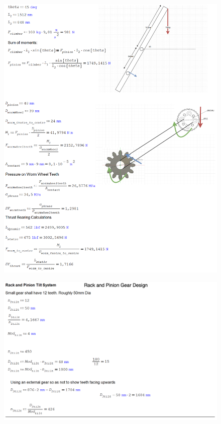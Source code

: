 \begin{figure}[H]
    \centering
    \includegraphics[width=1\linewidth]{chaps-append/calcs/tilting_max_torque_calcs.png}
\end{figure}
\begin{figure}[H]
    \centering
    \includegraphics[width=1\linewidth]{chaps-append/calcs/rack_pinion_calcs.png}
\end{figure}

